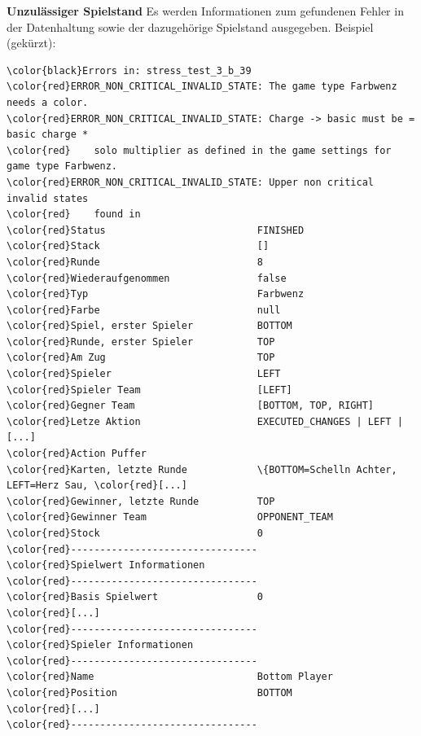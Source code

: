 \documentclass[
							a4paper, 
							11pt, 
							openany, 
							liststotoc,
							parskip=half, 
   							headings=normal
						]{scrreprt}
\begin{document}
{\textbf{Unzulässiger Spielstand}\newline
Es werden Informationen zum gefundenen Fehler in der Datenhaltung sowie der dazugehörige Spielstand ausgegeben.\newline
Beispiel (gekürzt):
\small
\begin{Verbatim}[commandchars=\\\{\}]
\color{black}Errors in: stress_test_3_b_39
\color{red}ERROR_NON_CRITICAL_INVALID_STATE: The game type Farbwenz needs a color.
\color{red}ERROR_NON_CRITICAL_INVALID_STATE: Charge -> basic must be = basic charge *
\color{red}    solo multiplier as defined in the game settings for game type Farbwenz.
\color{red}ERROR_NON_CRITICAL_INVALID_STATE: Upper non critical invalid states
\color{red}    found in 
\color{red}Status                          FINISHED                        
\color{red}Stack                           []
\color{red}Runde                           8                               
\color{red}Wiederaufgenommen               false                           
\color{red}Typ                             Farbwenz                        
\color{red}Farbe                           null                            
\color{red}Spiel, erster Spieler           BOTTOM                          
\color{red}Runde, erster Spieler           TOP                             
\color{red}Am Zug                          TOP                             
\color{red}Spieler                         LEFT                            
\color{red}Spieler Team                    [LEFT]                          
\color{red}Gegner Team                     [BOTTOM, TOP, RIGHT]            
\color{red}Letze Aktion                    EXECUTED_CHANGES | LEFT | [...]
\color{red}Action Puffer                   
\color{red}Karten, letzte Runde            \{BOTTOM=Schelln Achter, LEFT=Herz Sau, \color{red}[...]
\color{red}Gewinner, letzte Runde          TOP                             
\color{red}Gewinner Team                   OPPONENT_TEAM                   
\color{red}Stock                           0                               
\color{red}--------------------------------
\color{red}Spielwert Informationen         
\color{red}--------------------------------
\color{red}Basis Spielwert                 0                               
\color{red}[...]                         
\color{red}--------------------------------
\color{red}Spieler Informationen           
\color{red}--------------------------------
\color{red}Name                            Bottom Player                   
\color{red}Position                        BOTTOM                          
\color{red}[...]      
\color{red}--------------------------------
\end{Verbatim}
\normalsize
\bigskip

}
\end{document}
